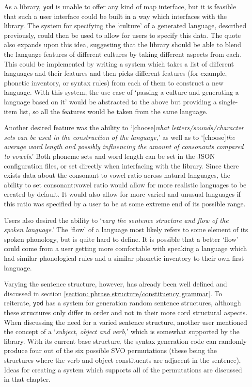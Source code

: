 \documentclass{report}
\begin{document}
	As a library, \texttt{yod} is unable to offer any kind of map interface, but it is feasible that such a user interface could be built in a way which interfaces with the library. The system for specifying the `culture' of a generated language, described previously, could then be used to allow for users to specify this data. The quote also expands upon this idea, suggesting that the library should be able to blend the language features of different cultures by taking different aspects from each. This could be implemented by writing a system which takes a list of different languages and their features and then picks different features (for example, phonetic inventory, or syntax rules) from each of them to construct a new language. With this system, the use case of `passing a culture and generating a language based on it' would be abstracted to the above but providing a single-item list, so all the features would be taken from the same language.
	
	Another desired feature was the ability to `[choose]\textit{what letters/sounds/character sets can be used in the construction of the language,}' as well as to `[choose]\textit{the average word length and possibly influencing the amount of consonants compared to vowels}.' Both phoneme sets and word length can be set in the JSON configuration files, or set directly when interfacing with the library. Since there exists data about the consonant to vowel ratio across natural languages\cite{wals-3}, the ability to set consonant:vowel ratio would allow for more realistic languages to be created by default. It would also allow for more varied and unusual languages if this ratio was specified by a user to be at some extreme end of its possible range.
	
	Users also desired the ability to `\textit{vary the sentence structure and flow of the spoken language}.' The `flow' of a language most likely refers to some element of its spoken phonology, but is quite hard to define. It is possible that a better `flow' could come from a user getting more comfortable with speaking a language which had similar phonological rules and a similar phonetic inventory to their own first language.
	
	Varying the sentence structure, however, has already been well defined and discussed in section \ref{section: phrase structure/constituency grammar}. To reiterate, \texttt{yod} has a system for generation random sentence structures, although these structures only differ in order and not in their more cord structural aspects. When discussing the need for a varied sentence structure, another user mentioned the concept of a `\textit{subject, object and verb},' which is somewhat supported by the library. With its current base structure, the syntax generation code can randomly produce four out of the six possible SVO permutations (these being the structures where the verb and object constituents are adjacent in the sentence). Ideas for creating a system which supports all of the permutations are discussed in that chapter.
	
\end{document}

